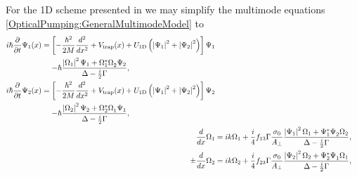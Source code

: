 For the 1D scheme presented in  we may simplify the multimode equations \eqref{OpticalPumping:GeneralMultimodeModel} to
\begin{subequations}
    \label{OpticalPumping:OverlappingCondensatesEvolution}
    \begin{align}
        \begin{split}
            i \hbar \frac{\partial}{\partial t} \Psi_1(x) &= \left[- \frac{\hbar^2}{2M}\frac{d^2}{dx^2} + V_\text{trap}(x) + U_\text{1D}\left(\abs{\Psi_1}^2 + \abs{\Psi_2}^2\right)  \right] \Psi_1\\
            &\relphantom{=} - \hbar \frac{\abs{\Omega_1}^2\Psi_1 + \Omega_1^* \Omega_2^{\phantom{*}}\Psi_2}{\Delta - \frac{i}{2} \Gamma},
        \end{split} \label{OpticalPumping:OverlappingCondensatesEvolution:Psi1}\\
        \begin{split}
            i \hbar \frac{\partial}{\partial t} \Psi_2(x) &= \left[- \frac{\hbar^2}{2M}\frac{d^2}{dx^2} + V_\text{trap}(x) + U_\text{1D}\left(\abs{\Psi_1}^2 + \abs{\Psi_2}^2\right)  \right] \Psi_2\\
            &\relphantom{=} - \hbar \frac{\abs{\Omega_2}^2 \Psi_2 + \Omega_2^* \Omega_1^{\phantom{*}} \Psi_1}{\Delta - \frac{i}{2} \Gamma},
        \end{split} \label{OpticalPumping:OverlappingCondensatesEvolution:Psi2}\\
        \frac{d}{dx} \Omega_1 &= i k \Omega_1 + \frac{i}{4} f_{13} \Gamma \frac{\sigma_0}{A_\perp} \frac{\abs{\Psi_1}^2 \Omega_1 + \Psi_1^* \Psi_2^{\phantom{*}}\Omega_2}{\Delta - \frac{i}{2} \Gamma}, \label{OpticalPumping:OverlappingCondensatesEvolution:Omega1}\\
        \pm \frac{d}{dx} \Omega_2 &= i k \Omega_2 + \frac{i}{4} f_{23} \Gamma \frac{\sigma_0}{A_\perp} \frac{\abs{\Psi_2}^2 \Omega_2 + \Psi_2^* \Psi_1^{\phantom{*}} \Omega_1}{\Delta - \frac{i}{2} \Gamma}, \label{OpticalPumping:OverlappingCondensatesEvolution:Omega2}
    \end{align}
\end{subequations}

